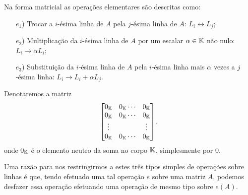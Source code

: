 Na forma matricial as opera\c{c}\~oes elementares s\~ao descritas como:
\begin{itemize}
	\item[$e_1$)] Trocar a $i$-\'esima linha de $A$ pela $j$-\'esima linha de $A$: $L_i \leftrightarrow L_j$;
	\item[$e_2$)] Multiplica\c{c}\~ao da $i$-\'esima linha de $A$ por um escalar $\alpha \in \mathbb{K}$ n\~ao nulo: $L_i \rightarrow \alpha L_i$;
	\item[$e_3$)] Substitui\c{c}\~ao da $i$-\'esima linha de $A$ pela $i$-\'esima linha mais $\alpha$ vezes a $j$-\'esima linha: $L_i \rightarrow L_i + \alpha L_j$.
\end{itemize}

\begin{observacao}
	Denotaremos a matriz
	\[
		\begin{bmatrix}
			0_{\mathbb{K}} & 0_{\mathbb{K}} \cdots & 0_{\mathbb{K}}\\
			0_{\mathbb{K}} & 0_{\mathbb{K}} \cdots & 0_{\mathbb{K}}\\
			\vdots & & \vdots\\
			0_{\mathbb{K}} & 0_{\mathbb{K}} \cdots & 0_{\mathbb{K}}
		\end{bmatrix},
	\]
	onde $0_{\mathbb{K}}$ \'e o elemento neutro da soma no corpo $\mathbb{K}$, simplesmente por $0$.
\end{observacao}

Uma raz\~ao para nos restringirmos a estes tr\^es tipos simples de opera\c{c}\~oes sobre linhas \'e que, tendo efetuado uma tal opera\c{c}\~ao $e$ sobre uma matriz $A$, podemos desfazer essa opera\c{c}\~ao efetuando uma opera\c{c}\~ao de mesmo tipo sobre $e(A)$.

